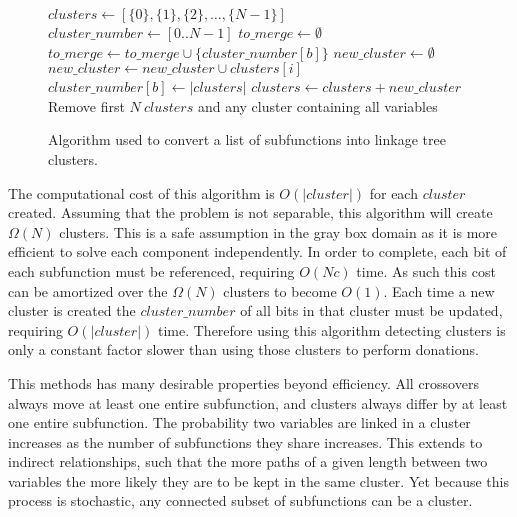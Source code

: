 \begin{figure}
  \begin{algorithmic}[1]
    \State $clusters \leftarrow [\{0\}, \{1\}, \{2\}, \dots, \{N-1\}]$
    \State $cluster\_number \leftarrow [0 .. N-1]$
      \State $to\_merge \leftarrow \emptyset$
        \State $to\_merge \leftarrow to\_merge \cup \{cluster\_number[b]\}$
      \EndFor
        \State $new\_cluster \leftarrow \emptyset$
          \State $new\_cluster \leftarrow new\_cluster \cup clusters[i]$
        \EndFor
          \State $cluster\_number[b] \leftarrow |clusters|$
        \EndFor
        \State $clusters \leftarrow clusters + new\_cluster$
      \EndIf
    \EndFor
    \State Remove first $N~clusters$ and any cluster containing all variables
  \EndProcedure
\end{algorithmic}
  \caption{Algorithm used to convert a list of subfunctions into linkage tree clusters.}
  \label{fig-sfx-tree}
\end{figure}

The computational cost of this algorithm is $O(|cluster|)$ for each $cluster$ created.
Assuming that the problem is not separable, this algorithm will create
$\Omega(N)$ clusters. This is a safe assumption in the gray box domain as it is more
efficient to solve each component independently.
In order to complete,
each bit of each subfunction must be referenced, requiring $O(Nc)$ time. As such this cost can
be amortized over the $\Omega(N)$ clusters to become $O(1)$.
Each time a new cluster is created
the $cluster\_number$ of all bits in that cluster must be updated, requiring $O(|cluster|)$ time.
Therefore using this algorithm detecting clusters is only a constant factor slower than using those clusters
to perform donations.

This methods has many desirable properties beyond efficiency. All crossovers always move at least one entire subfunction,
and clusters always differ by at least one entire subfunction. The probability two variables are linked in a
cluster increases as the number of subfunctions they share increases. This extends to indirect relationships, such that
the more paths of a given length between two variables the more likely they are to be kept in the same cluster.
Yet because this process is stochastic, any connected subset of subfunctions can be a cluster.


